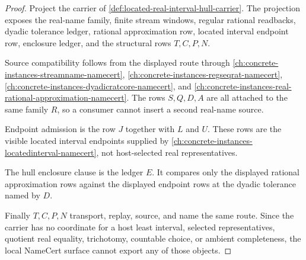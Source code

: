 \begin{proof}
Project the carrier of \autoref{def:located-real-interval-hull-carrier}. The projection exposes the real-name family, finite stream windows, regular rational readbacks, dyadic tolerance ledger, rational approximation row, located interval endpoint row, enclosure ledger, and the structural rows $T,C,P,N$.

Source compatibility follows from the displayed route through \autoref{ch:concrete-instances-streamname-namecert}, \autoref{ch:concrete-instances-regseqrat-namecert}, \autoref{ch:concrete-instances-dyadicratcore-namecert}, and \autoref{ch:concrete-instances-real-rational-approximation-namecert}. The rows $S,Q,D,A$ are all attached to the same family $R$, so a consumer cannot insert a second real-name source.

Endpoint admission is the row $J$ together with $L$ and $U$. These rows are the visible located interval endpoints supplied by \autoref{ch:concrete-instances-locatedinterval-namecert}, not host-selected real representatives.

The hull enclosure clause is the ledger $E$. It compares only the displayed rational approximation rows against the displayed endpoint rows at the dyadic tolerance named by $D$.

Finally $T,C,P,N$ transport, replay, source, and name the same route. Since the carrier has no coordinate for a host least interval, selected representatives, quotient real equality, trichotomy, countable choice, or ambient completeness, the local NameCert surface cannot export any of those objects.
\end{proof}

